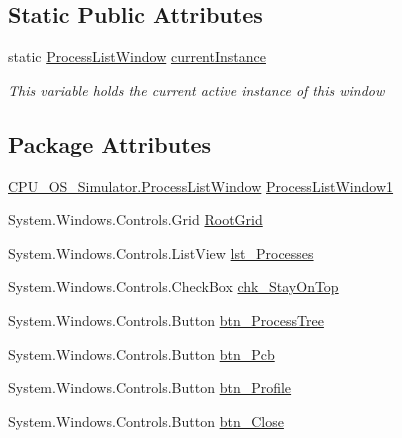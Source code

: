 \subsection*{Static Public Attributes}
\begin{DoxyCompactItemize}
\item 
static \hyperlink{class_c_p_u___o_s___simulator_1_1_process_list_window}{Process\+List\+Window} \hyperlink{class_c_p_u___o_s___simulator_1_1_process_list_window_a102d7796240201b548db10f1d129d9d0}{current\+Instance}
\begin{DoxyCompactList}\small\item\em This variable holds the current active instance of this window \end{DoxyCompactList}\end{DoxyCompactItemize}
\subsection*{Package Attributes}
\begin{DoxyCompactItemize}
\item 
\hyperlink{class_c_p_u___o_s___simulator_1_1_process_list_window}{C\+P\+U\+\_\+\+O\+S\+\_\+\+Simulator.\+Process\+List\+Window} \hyperlink{class_c_p_u___o_s___simulator_1_1_process_list_window_aab0df5ea0ee8f08294b493bf733749d7}{Process\+List\+Window1}
\item 
System.\+Windows.\+Controls.\+Grid \hyperlink{class_c_p_u___o_s___simulator_1_1_process_list_window_af216af01608102c81507d1f29399ec1a}{Root\+Grid}
\item 
System.\+Windows.\+Controls.\+List\+View \hyperlink{class_c_p_u___o_s___simulator_1_1_process_list_window_a74ca7787bf825406ce05b71e357e29ed}{lst\+\_\+\+Processes}
\item 
System.\+Windows.\+Controls.\+Check\+Box \hyperlink{class_c_p_u___o_s___simulator_1_1_process_list_window_adad52fa0cc305fb0effcbe628c00f54e}{chk\+\_\+\+Stay\+On\+Top}
\item 
System.\+Windows.\+Controls.\+Button \hyperlink{class_c_p_u___o_s___simulator_1_1_process_list_window_a425c0a45111e925325c81da79602ecb5}{btn\+\_\+\+Process\+Tree}
\item 
System.\+Windows.\+Controls.\+Button \hyperlink{class_c_p_u___o_s___simulator_1_1_process_list_window_a864b71efd3458da69accb656034e3072}{btn\+\_\+\+Pcb}
\item 
System.\+Windows.\+Controls.\+Button \hyperlink{class_c_p_u___o_s___simulator_1_1_process_list_window_a9e9f12c29b457cce17d8591123397ebe}{btn\+\_\+\+Profile}
\item 
System.\+Windows.\+Controls.\+Button \hyperlink{class_c_p_u___o_s___simulator_1_1_process_list_window_ac1177a26dd05a2ffee666255abf6d6a1}{btn\+\_\+\+Close}
\end{DoxyCompactItemize}

